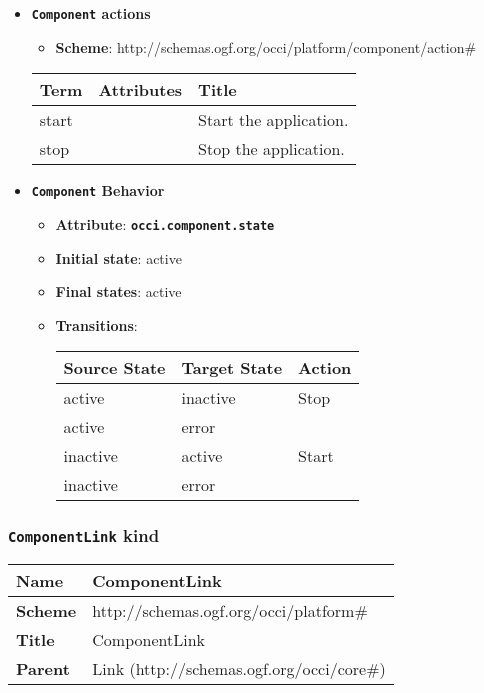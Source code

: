 \begin{itemize}
\item \textbf{\texttt{Component} actions}

\begin{itemize}
	\item \textbf{Scheme}: http://schemas.ogf.org/occi/platform/component/action\#
\end{itemize}

\begin{center}
\begin{tabular}{|l|l|l|}
  \hline
  \textbf{Term}  & \textbf{Attributes} & \textbf{Title} \\
  \hline  
  start & & Start the application. \\
  \hline
  stop & & Stop the application. \\
  \hline
\end{tabular}
\end{center}
\end{itemize}

\begin{itemize}
\item \textbf{\texttt{Component} Behavior}
\begin{itemize}
\item \textbf{Attribute}: \textbf{\texttt{occi.component.state}}
\item \textbf{Initial state}: active
\item \textbf{Final states}:  	active
\item \textbf{Transitions}:

\begin{center}
\begin{tabular}{|l|l|l|}
  \hline
  \textbf{Source State} & \textbf{Target State} & \textbf{Action} \\
  \hline  
  active & inactive & Stop  \\
  \hline
  active & error &   \\
  \hline
  inactive & active & Start  \\
  \hline
  inactive & error &   \\
  \hline
\end{tabular}
\end{center}
\end{itemize}
\end{itemize}

\subsubsection{\texttt{ComponentLink} kind}
\begin{center}
\begin{tabular}{|l|l|}
  \hline
  \textbf{Name} & ComponentLink \\
  \hline  
  \textbf{Scheme} & http://schemas.ogf.org/occi/platform\# \\
  \hline
  \textbf{Title} & ComponentLink \\
  \hline
  \textbf{Parent} & Link (http://schemas.ogf.org/occi/core\#) \\
  \hline
\end{tabular}
\end{center}



